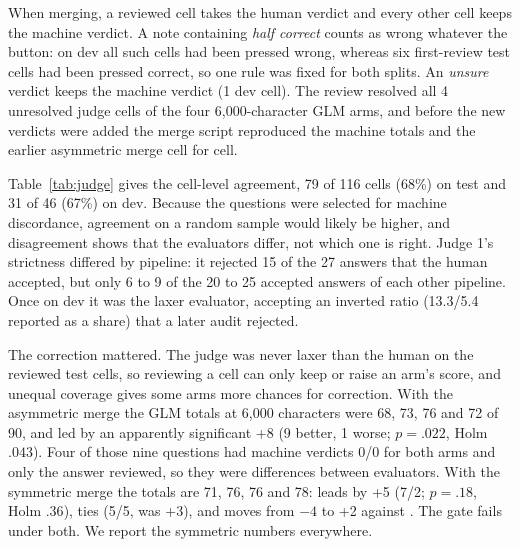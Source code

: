 When merging, a reviewed cell takes the human verdict and every other cell keeps the machine verdict. A note containing \emph{half correct} counts as wrong whatever the button: on dev all such cells had been pressed wrong, whereas six first-review test cells had been pressed correct, so one rule was fixed for both splits. An \emph{unsure} verdict keeps the machine verdict (1 dev cell). The review resolved all 4 unresolved judge cells of the four 6,000-character GLM arms, and before the new verdicts were added the merge script reproduced the machine totals and the earlier asymmetric merge cell for cell.



Table~\ref{tab:judge} gives the cell-level agreement, 79 of 116 cells (68\%) on test and 31 of 46 (67\%) on dev. Because the questions were selected for machine discordance, agreement on a random sample would likely be higher, and disagreement shows that the evaluators differ, not which one is right. Judge 1's strictness differed by pipeline: it rejected 15 of the 27 \setr{} answers that the human accepted, but only 6 to 9 of the 20 to 25 accepted answers of each other pipeline. Once on dev it was the laxer evaluator, accepting an inverted ratio (13.3/5.4 reported as a share) that a later audit rejected.

The correction mattered. The judge was never laxer than the human on the reviewed test cells, so reviewing a cell can only keep or raise an arm's score, and unequal coverage gives some arms more chances for correction. With the asymmetric merge the GLM totals at 6,000 characters were \hybrid{} 68, \hr{} 73, \lexb{} 76 and \setr{} 72 of 90, and \lexb{} led \hybrid{} by an apparently significant +8 (9 better, 1 worse; $p=.022$, Holm $.043$). Four of those nine questions had machine verdicts 0/0 for both arms and only the \lexb{} answer reviewed, so they were differences between evaluators. With the symmetric merge the totals are 71, 76, 76 and 78: \lexb{} leads \hybrid{} by +5 (7/2; $p=.18$, Holm $.36$), ties \hr{} (5/5, was +3), and \setr{} moves from $-4$ to +2 against \lexb. The gate fails under both. We report the symmetric numbers everywhere.

